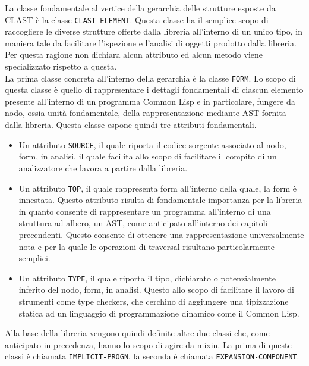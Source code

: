 La classe fondamentale al vertice della gerarchia delle strutture esposte da
CLAST è la classe \texttt{CLAST-ELEMENT}. Questa classe ha il semplice scopo
di raccogliere le diverse strutture offerte dalla libreria all'interno di un
unico tipo, in maniera tale da facilitare l’ispezione e l’analisi di oggetti
prodotto dalla libreria. Per questa ragione non dichiara alcun attributo ed
alcun metodo viene specializzato rispetto a questa.\\

La prima classe concreta all’interno della gerarchia è la classe
\texttt{FORM}. Lo scopo di questa classe è quello di rappresentare i dettagli
fondamentali di ciascun elemento presente all’interno di un programma Common
Lisp e in particolare, fungere da nodo, ossia unità fondamentale, della
rappresentazione mediante AST fornita dalla libreria. Questa classe espone
quindi tre attributi fondamentali.\\

\begin{itemize}

\item Un attributo \texttt{SOURCE}, il quale riporta il codice sorgente
associato al nodo, form, in analisi, il quale facilita allo scopo di
facilitare il compito di un analizzatore che lavora a partire dalla libreria.

\item Un attributo \texttt{TOP},  il quale rappresenta form all’interno della
quale, la form è innestata. Questo attributo risulta di fondamentale
importanza per la libreria in quanto consente di rappresentare un programma
all’interno di una struttura ad albero, un AST, come anticipato all’interno
dei capitoli precendenti. Questo consente di ottenere una rappresentazione
universalmente nota e per la quale le operazioni di traversal risultano
particolarmente semplici.

\item Un attributo \texttt{TYPE}, il quale riporta il tipo, dichiarato o
potenzialmente inferito del nodo, form, in analisi. Questo allo scopo di
facilitare il lavoro di strumenti come type checkers, che cerchino di
aggiungere una tipizzazione statica ad un linguaggio di programmazione
dinamico come il Common Lisp.\\

\end{itemize}

Alla base della libreria vengono quindi definite altre due classi che, come
anticipato in precedenza, hanno lo scopo di agire da mixin. La prima di queste
classi è chiamata \texttt{IMPLICIT-PROGN}, la seconda è chiamata \texttt
{EXPANSION-COMPONENT}.\\

